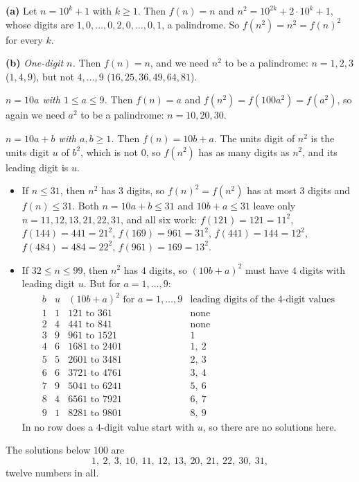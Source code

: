 \textbf{(a)} Let $n=10^k+1$ with $k\ge1$. Then $f(n)=n$ and $n^2=10^{2k}+2\cdot10^k+1$, whose digits are $1,0,\dots,0,2,0,\dots,0,1$, a palindrome. So $f\left(n^2\right)=n^2=f(n)^2$ for every $k$.

\textbf{(b)} \emph{One-digit $n$.} Then $f(n)=n$, and we need $n^2$ to be a palindrome: $n=1,2,3$ ($1,4,9$), but not $4,\dots,9$ ($16,25,36,49,64,81$).

\emph{$n=10a$ with $1\le a\le9$.} Then $f(n)=a$ and $f\left(n^2\right)=f\left(100a^2\right)=f\left(a^2\right)$, so again we need $a^2$ to be a palindrome: $n=10,20,30$.

\emph{$n=10a+b$ with $a,b\ge1$.} Then $f(n)=10b+a$. The units digit of $n^2$ is the units digit $u$ of $b^2$, which is not $0$, so $f\left(n^2\right)$ has as many digits as $n^2$, and its leading digit is $u$.
\begin{itemize}
\item If $n\le31$, then $n^2$ has $3$ digits, so $f(n)^2=f\left(n^2\right)$ has at most $3$ digits and $f(n)\le31$. Both $n=10a+b\le31$ and $10b+a\le31$ leave only $n=11,12,13,21,22,31$, and all six work: $f(121)=121=11^2$, $f(144)=441=21^2$, $f(169)=961=31^2$, $f(441)=144=12^2$, $f(484)=484=22^2$, $f(961)=169=13^2$.
\item If $32\le n\le99$, then $n^2$ has $4$ digits, so $(10b+a)^2$ must have $4$ digits with leading digit $u$. But for $a=1,\dots,9$:
\[\begin{array}{c|c|c|c}
b&u&(10b+a)^2\text{ for }a=1,\dots,9&\text{leading digits of the $4$-digit values}\\\hline
1&1&121\text{ to }361&\text{none}\\
2&4&441\text{ to }841&\text{none}\\
3&9&961\text{ to }1521&1\\
4&6&1681\text{ to }2401&1,\ 2\\
5&5&2601\text{ to }3481&2,\ 3\\
6&6&3721\text{ to }4761&3,\ 4\\
7&9&5041\text{ to }6241&5,\ 6\\
8&4&6561\text{ to }7921&6,\ 7\\
9&1&8281\text{ to }9801&8,\ 9
\end{array}\]
In no row does a $4$-digit value start with $u$, so there are no solutions here.
\end{itemize}
The solutions below $100$ are
\[\boxed{1,\ 2,\ 3,\ 10,\ 11,\ 12,\ 13,\ 20,\ 21,\ 22,\ 30,\ 31},\]
twelve numbers in all.
